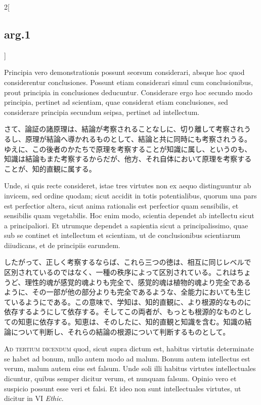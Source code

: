 \documentclass[paper=a4paper,fontsize=10pt,jafontsize=9pt,titlepage]{jlreq}
\begin{document}
\begin{paracol}{2}[\subsection{arg.1}]
\switchcolumn*

Principia vero demonstrationis possunt seorsum considerari, absque hoc
quod considerentur conclusiones. Possunt etiam considerari simul cum
conclusionibus, prout principia in conclusiones
deducuntur. Considerare ergo hoc secundo modo principia, pertinet ad
scientiam, quae considerat etiam conclusiones, sed considerare
principia secundum seipsa, pertinet ad intellectum.

\switchcolumn

さて、論証の諸原理は、結論が考察されることなしに、切り離して考察されう
るし、原理が結論へ導かれるものとして、結論と共に同時にも考察されうる。
ゆえに、この後者のかたちで原理を考察することが知識に属し、というのも、
知識は結論もまた考察するからだが、他方、それ自体において原理を考察する
ことが、知的直観に属する。

\switchcolumn*

Unde, si quis recte consideret, istae tres virtutes non ex aequo
distinguuntur ab invicem, sed ordine quodam; sicut accidit in totis
potentialibus, quorum una pars est perfectior altera, sicut anima
rationalis est perfectior quam sensibilis, et sensibilis quam
vegetabilis. Hoc enim modo, scientia dependet ab intellectu sicut a
principaliori. Et utrumque dependet a sapientia sicut a
principalissimo, quae sub se continet et intellectum et scientiam, ut
de conclusionibus scientiarum diiudicans, et de principiis earundem.

\switchcolumn

したがって、正しく考察するならば、これら三つの徳は、相互に同じレベルで
区別されているのではなく、一種の秩序によって区別されている。これはちょ
うど、理性的魂が感覚的魂よりも完全で、感覚的魂は植物的魂より完全である
ように、その一部が他の部分よりも完全であるような、全能力においても生じ
ているようにである。この意味で、学知は、知的直観に、より根源的なものに
依存するようにして依存する。そしてこの両者が、もっとも根源的なものとし
ての知恵に依存する。知恵は、そのしたに、知的直観と知識を含む。知識の結
論について判断し、それらの結論の根源について判断するものとして。

\switchcolumn*[\subsection{ad.3}]

{\scshape Ad tertium dicendum} quod, sicut supra dictum est, habitus
virtutis determinate se habet ad bonum, nullo autem modo ad
malum. Bonum autem intellectus est verum, malum autem eius est
falsum. Unde soli illi habitus virtutes intellectuales dicuntur,
quibus semper dicitur verum, et nunquam falsum. Opinio vero et
suspicio possunt esse veri et falsi. Et ideo non sunt intellectuales
virtutes, ut dicitur in VI {\itshape Ethic}.


\end{paracol}
\end{document}
